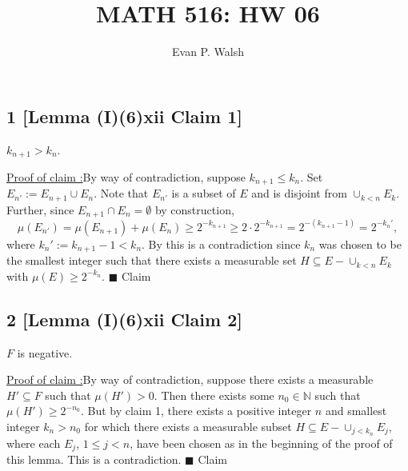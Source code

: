 \documentclass[12pt]{article}
\title{MATH 516: HW 06}
\author{Evan P. Walsh}
\newcounter{ProofCounter}
\newcounter{ClaimCounter}[ProofCounter]
\newenvironment{claimproof}[1]{\par\noindent\underline{Proof of claim \theClaimCounter:}\space#1}{\hfill $\blacksquare$ Claim \theClaimCounter}
\begin{document}
\maketitle

\subsection*{1 [Lemma (I)(6)xii Claim 1]}
\begin{tcolorbox}
$k_{n+1} > k_{n}$.
\end{tcolorbox}
\begin{claimproof}
By way of contradiction, suppose $k_{n+1} \leq k_{n}$. Set $E_{n'} := E_{n+1}\cup E_{n}$. Note that $E_{n'}$ is a subset of $E$ and is 
disjoint from $\cup_{k < n}E_{k}$. Further, since $E_{n+1}\cap E_{n} = \emptyset$ by construction,
\[ \mu(E_{n'}) = \mu(E_{n+1}) + \mu(E_{n}) \geq 2^{-k_{n+1}} \geq 2\cdot 2^{-k_{n+1}} = 2^{-(k_{n+1}-1)} = 2^{-k_{n}'}, \]
where $k_{n}' := k_{n+1} - 1 < k_{n}$. By this is a contradiction since $k_{n}$ was chosen to be the smallest integer such that there exists a 
measurable set $H \subseteq E - \cup_{k < n}E_{k}$ with $\mu(E) \geq 2^{-k_{n}}$.
\end{claimproof}



\subsection*{2 [Lemma (I)(6)xii Claim 2]}
\begin{tcolorbox}
$F$ is negative.
\end{tcolorbox}
\begin{claimproof}
By way of contradiction, suppose there exists a measurable $H' \subseteq F$ such that $\mu(H') > 0$. Then there exists some $n_{0} \in \mathbb{N}$ such that 
$\mu(H') \geq 2^{-n_{0}}$. But by claim 1, there exists a positive integer $n$ and smallest integer $k_{n} > n_{0}$ for which there exists a measurable subset $H \subseteq 
E - \cup_{j < k_{n}}E_{j}$, where each $E_{j}$, $1 \leq j < n$, have been chosen as in the beginning of the proof of this lemma. This is a contradiction.
\end{claimproof}


\newpage
\end{document}
